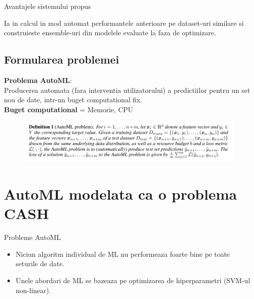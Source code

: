 \documentclass{beamer}
\begin{document}
\begin{frame}{Avantajele sistemului propus}
		\begin{center}
			Ia in calcul in mod automat performantele anterioare pe dataset-uri similare si construieste ensemble-uri din modelele evaluate la faza de optimizare.
		\end{center}
\end{frame}


\subsection{Formularea problemei}
\begin{frame}
	\begin{center}
		\textbf{Problema AutoML}:\\
		Producerea automata (fara interventia utilizatorului) a predictiilor pentru un set nou de date, intr-un buget computational fix.\\
		\vspace{0.5cm}
		\textbf{Buget computational} = Memorie, CPU
	\end{center}
\end{frame}

\begin{frame}
	\begin{figure}[H]
	\centering
	\includegraphics[scale=0.5]{formula_automl.PNG}
	\end{figure}
\end{frame}

\section{AutoML modelata ca o problema CASH}

\begin{frame}{Probleme AutoML}
	\begin{center}
		\begin{itemize}
			\item Niciun algoritm individual de ML nu performeaza foarte bine pe toate seturile de date.
			\item Unele abordari de ML se bazeaza pe optimizarea de hiperparametri (SVM-ul non-linear). 
		\end{itemize}
	\end{center}
\end{frame}
\end{document}
